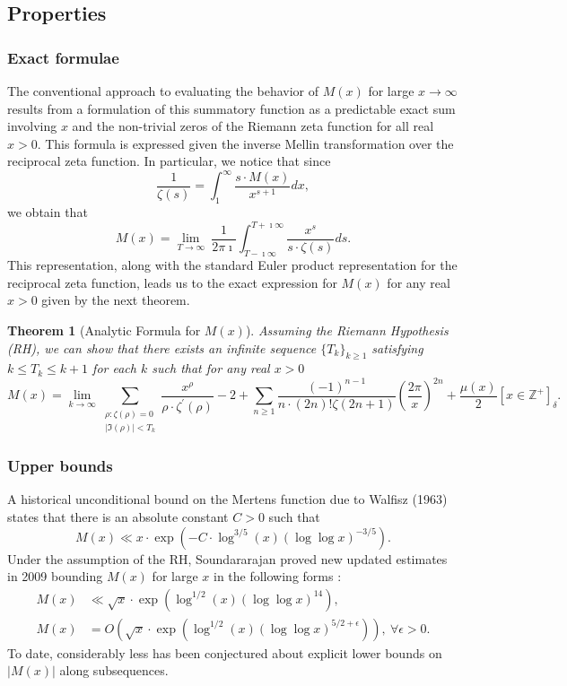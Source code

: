 \documentclass[11pt,reqno,a4letter]{article}
\numberwithin{figure}{section}
\numberwithin{table}{section}
\newcommand{\Iverson}[1]{\ensuremath{\left[#1\right]_{\delta}}}
\theoremstyle{plain}
\newtheorem{theorem}{Theorem}
\numberwithin{theorem}{section}
\theoremstyle{definition}
\begin{document}
\subsection{Properties} 

\subsubsection{Exact formulae} 

The conventional approach to evaluating the behavior of $M(x)$ for large 
$x \rightarrow \infty$ results from a formulation of this summatory 
function as a predictable exact sum involving $x$ and the non-trivial 
zeros of the Riemann zeta function for all real $x > 0$. 
This formula is expressed given the inverse Mellin transformation 
over the reciprocal zeta function. In particular, 
we notice that since 
\[
\frac{1}{\zeta(s)} = \int_1^{\infty} \frac{s \cdot M(x)}{x^{s+1}} dx, 
\]
we obtain that 
\[
M(x) = \lim_{T \rightarrow \infty}\ \frac{1}{2\pi\imath} \int_{T-\imath\infty}^{T+\imath\infty} 
     \frac{x^s}{s \cdot \zeta(s)} ds. 
\] 
This representation, along with the standard Euler product 
representation for the reciprocal zeta function, leads us to the 
exact expression for $M(x)$ for any real $x > 0$ given by the next theorem. 

\begin{theorem}[Analytic Formula for $M(x)$] 
\label{theorem_MxMellinTransformInvFormula} 
Assuming the Riemann Hypothesis (RH), we can show that there exists an infinite sequence 
$\{T_k\}_{k \geq 1}$ satisfying $k \leq T_k \leq k+1$ for each $k$ 
such that for any real $x > 0$ 
\[
M(x) = \lim_{k \rightarrow \infty} 
     \sum_{\substack{\rho: \zeta(\rho) = 0 \\ |\Im(\rho)| < T_k}} 
     \frac{x^{\rho}}{\rho \cdot \zeta^{\prime}(\rho)} - 2 + 
     \sum_{n \geq 1} \frac{(-1)^{n-1}}{n \cdot (2n)! \zeta(2n+1)} 
     \left(\frac{2\pi}{x}\right)^{2n} + 
     \frac{\mu(x)}{2} \Iverson{x \in \mathbb{Z}^{+}}. 
\] 
\end{theorem} 

\subsubsection{Upper bounds} 

A historical unconditional bound on the Mertens function due to Walfisz (1963) 
states that there is an absolute constant $C > 0$ such that 
$$M(x) \ll x \cdot \exp\left(-C \cdot \log^{3/5}(x) 
  (\log\log x)^{-3/5}\right).$$ 
Under the assumption of the RH, Soundararajan proved new updated estimates in 2009 
bounding $M(x)$ for large $x$ in the following forms \cite{SOUND-MERTENS-ANNALS}: 
\begin{align*} 
M(x) & \ll \sqrt{x} \cdot \exp\left(\log^{1/2}(x) (\log\log x)^{14}\right), \\ 
M(x) & = O\left(\sqrt{x} \cdot \exp\left( 
     \log^{1/2}(x) (\log\log x)^{5/2+\epsilon}\right)\right),\ 
     \forall \epsilon > 0. 
\end{align*} 
To date, 
considerably less has been conjectured about explicit lower bounds on $|M(x)|$ along 
subsequences. 
\end{document}
